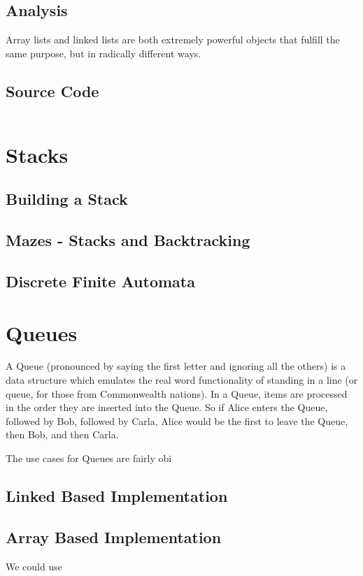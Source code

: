 \documentclass[10pt,a4paper]{book}
\begin{document}
\section{Analysis}
Array lists and linked lists are both extremely powerful objects that fulfill  the same purpose, but in radically different ways. 

\section{Source Code}
\inputminted{python3}{code/linkedlist.py}


\chapter{Stacks}

\section{Building a Stack}

\section{Mazes - Stacks and Backtracking}



\section{Discrete Finite Automata}

\chapter{Queues}

A Queue (pronounced by saying the first letter and ignoring all the others) is a data structure which emulates the real word functionality of standing in a line (or queue, for those from Commonwealth nations).  
In a Queue, items are processed in the order they are inserted into the Queue.  So if Alice enters the Queue, followed by Bob, followed by Carla, Alice would be the first to leave the Queue, then Bob, and then Carla.

The use cases for Queues are fairly obi

\section{Linked Based Implementation} 
\section{Array Based Implementation}
We could use 
\end{document}
